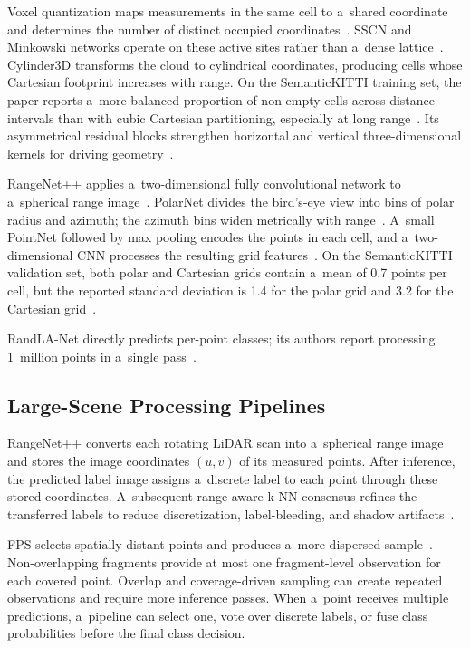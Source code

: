 Voxel quantization maps measurements in the same cell to a~shared coordinate and determines the number of distinct occupied coordinates~\citep{minkowski}. SSCN and Minkowski networks operate on these active sites rather than a~dense lattice~\citep{sscn,minkowski}. Cylinder3D transforms the cloud to cylindrical coordinates, producing cells whose Cartesian footprint increases with range. On the SemanticKITTI training set, the paper reports a~more balanced proportion of non-empty cells across distance intervals than with cubic Cartesian partitioning, especially at long range~\citep{cylinder3d}. Its asymmetrical residual blocks strengthen horizontal and vertical three-dimensional kernels for driving geometry~\citep{cylinder3d}.

RangeNet++ applies a~two-dimensional fully convolutional network to a~spherical range image~\citep{rangenet}. PolarNet divides the bird's-eye view into bins of polar radius and azimuth; the azimuth bins widen metrically with range~\citep{polarnet}. A~small PointNet followed by max pooling encodes the points in each cell, and a~two-dimensional CNN processes the resulting grid features~\citep{polarnet}. On the SemanticKITTI validation set, both polar and Cartesian grids contain a~mean of 0.7 points per cell, but the reported standard deviation is 1.4 for the polar grid and 3.2 for the Cartesian grid~\citep{polarnet}.

RandLA-Net directly predicts per-point classes; its authors report processing 1~million points in a~single pass~\citep{randlanet}.

\subsection{Large-Scene Processing Pipelines}

RangeNet++ converts each rotating LiDAR scan into a~spherical range image and stores the image coordinates $(u,v)$ of its measured points. After inference, the predicted label image assigns a~discrete label to each point through these stored coordinates. A~subsequent range-aware k-NN consensus refines the transferred labels to reduce discretization, label-bleeding, and shadow artifacts~\citep{rangenet}.

FPS selects spatially distant points and produces a~more dispersed sample~\citep{pointnetpp,randlanet}. Non-overlapping fragments provide at most one fragment-level observation for each covered point. Overlap and coverage-driven sampling can create repeated observations and require more inference passes. When a~point receives multiple predictions, a~pipeline can select one, vote over discrete labels, or fuse class probabilities before the final class decision.

